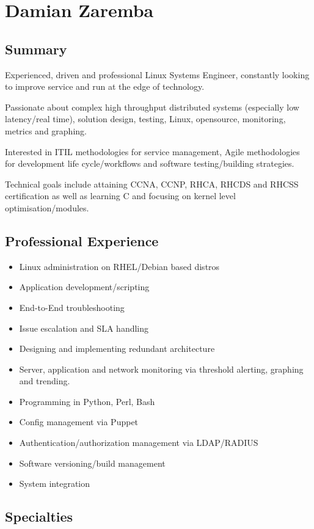 \section{Damian Zaremba}

\subsection{Summary}

Experienced, driven and professional Linux Systems Engineer, constantly
looking to improve service and run at the edge of technology.

Passionate about complex high throughput distributed systems (especially
low latency/real time), solution design, testing, Linux, opensource,
monitoring, metrics and graphing.

Interested in ITIL methodologies for service management, Agile
methodologies for development life cycle/workflows and software
testing/building strategies.

Technical goals include attaining CCNA, CCNP, RHCA, RHCDS and RHCSS
certification as well as learning C and focusing on kernel level
optimisation/modules.

\subsection{Professional Experience}

\begin{itemize}
\item
  Linux administration on RHEL/Debian based distros
\item
  Application development/scripting
\item
  End-to-End troubleshooting
\item
  Issue escalation and SLA handling
\item
  Designing and implementing redundant architecture
\item
  Server, application and network monitoring via threshold alerting,
  graphing and trending.
\item
  Programming in Python, Perl, Bash
\item
  Config management via Puppet
\item
  Authentication/authorization management via LDAP/RADIUS
\item
  Software versioning/build management
\item
  System integration
\end{itemize}
\subsection{Specialties}

